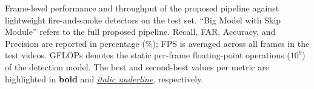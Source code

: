 \begin{table}[htbp]
    \caption{Frame-level performance and throughput of the proposed pipeline
    against lightweight fire-and-smoke detectors on the test set. ``Big
    Model with Skip Module'' refers to the full proposed pipeline. Recall,
    FAR, Accuracy, and Precision are reported in percentage (\%); FPS is
    averaged across all frames in the test videos. GFLOPs denotes the static
    per-frame floating-point operations ($10^9$) of the detection model. The
    best and second-best values per metric are highlighted in \textbf{bold} and
    \underline{\textit{italic underline}}, respectively.}
    \label{tb:perf_per_frame}
\end{table}
